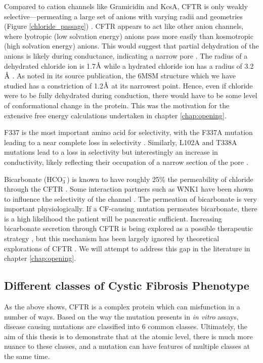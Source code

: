 Compared to cation channels like Gramicidin and KcsA, CFTR is only weakly selective---permeating a large set of anions with varying radii and geometries (Figure \ref{chloride_passage}) \cite{linsdell1998, tabcharani1997, poulsen1994}. CFTR appears to act like other anion channels, where lyotropic (low solvation energy) anions pass more easily than kosmotropic (high solvation energy) anions. This would suggest that partial dehydration of the anions is likely during conductance, indicating a narrow pore \cite{linsdell2000}. The radius of a dehydrated chloride ion is 1.7$\textup{\AA}$ while a hydrated chloride ion has a radius of 3.2$\textup{\AA}$ \cite{yang2002}. As noted in its source publication, the 6MSM structure which we have studied has a constriction of 1.2$\textup{\AA}$ at its narrowest point. Hence, even if chloride were to be fully dehydrated during conduction, there would have to be some level of conformational change in the protein. This was the motivation for the extensive free energy calculations undertaken in chapter \ref{chap:opening}.

F337 is the most important amino acid for selectivity, with the F337A mutation leading to a near complete loss in selectivity \cite{wei2016}. Similarly, L102A and T338A mutations lead to a loss in selectivity but interestingly an increase in conductivity, likely reflecting their occupation of a narrow section of the pore \cite{linsdell2001,ge2004}. 

Bicarbonate (HCO$_3^-$) is known to have roughly 25\% the permeability of chloride through the CFTR \cite{tang2009}. Some interaction partners such as WNK1 have been shown to influence the selectivity of the channel \cite{kim2019, garnett2011, kim2019a}. The permeation of bicarbonate is very important physiologically. If a CF-causing mutation permeates bicarbonate, there is a high likelihood the patient will be pancreatic sufficient. Increasing bicarbonate secretion through CFTR is being explored as a possible therapeutic strategy \cite{ferrera2021}, but this mechanism has been largely ignored by theoretical explorations of CFTR \cite{jun2016}. We will attempt to address this gap in the literature in chapter \ref{chap:opening}.


\subsection{Different classes of Cystic Fibrosis Phenotype}
As the above shows, CFTR is a complex protein which can misfunction in a number of ways. Based on the way the mutation presents in \textit{in vitro} assays, disease causing mutations are classified into 6 common classes. Ultimately, the aim of this thesis is to demonstrate that at the atomic level, there is much more nuance to these classes, and a mutation can have features of multiple classes at the same time.

